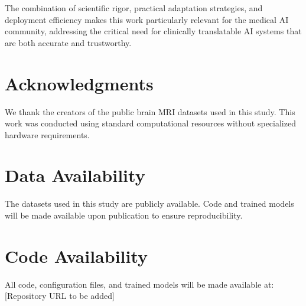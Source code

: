 \documentclass[11pt,a4paper]{article}
\begin{document}
The combination of scientific rigor, practical adaptation strategies, and deployment efficiency makes this work particularly relevant for the medical AI community, addressing the critical need for clinically translatable AI systems that are both accurate and trustworthy.

\section*{Acknowledgments}

We thank the creators of the public brain MRI datasets used in this study. This work was conducted using standard computational resources without specialized hardware requirements.

\section*{Data Availability}

The datasets used in this study are publicly available. Code and trained models will be made available upon publication to ensure reproducibility.

\section*{Code Availability}

All code, configuration files, and trained models will be made available at: [Repository URL to be added]
\end{document}
